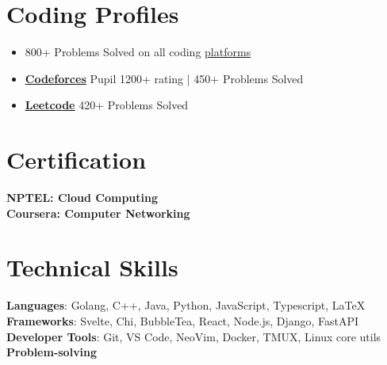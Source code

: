 \documentclass[letterpaper,11pt]{article}
\newcommand{\resumeItem}[1]{
  \item\small{
    {#1 \vspace{-2pt}}
  }
}
\newcommand{\resumeItemListStart}{\begin{itemize}}
\newcommand{\resumeItemListEnd}{\end{itemize}\vspace{-5pt}}
\begin{document}
\section{Coding Profiles}
    \resumeItemListStart
        \resumeItem{800+ Problems Solved on all coding \href{https://codolio.com/profile/RunAt}{\underline{platforms}}}
        \resumeItem{{\textbf{\href{https://codeforces.com/profile/RunAt}{\underline{Codeforces}}}} Pupil 1200+ rating | 450+ Problems Solved}
    
        \resumeItem{{\textbf{\href{https://leetcode.com/RunAtMe/}{\underline{Leetcode}}}} 420+ Problems Solved}
    \resumeItemListEnd

%
\section{Certification}
 \begin{itemize}[leftmargin=0.15in, label={}]
    \small{\item{
     \textbf{NPTEL: Cloud Computing} \\
     \textbf{Coursera: Computer Networking}
    }}
 \end{itemize}
%

\section{Technical Skills}
 \begin{itemize}[leftmargin=0.15in, label={}]
    \small{\item{
     \textbf{Languages}{: Golang, C++, Java, Python, JavaScript, Typescript, \LaTeX} \\
     \textbf{Frameworks}{: Svelte, Chi, BubbleTea, React, Node.js, Django, FastAPI} \\
     \textbf{Developer Tools}{: Git, VS Code, NeoVim, Docker, TMUX, Linux core utils} \\
     \textbf{Problem-solving}
    }}
 \end{itemize}


\end{document}
